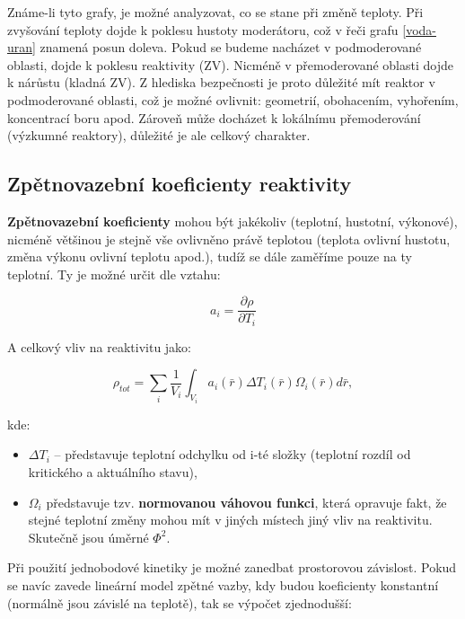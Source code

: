 Známe-li tyto grafy, je možné analyzovat, co se stane při změně teploty. Při zvyšování teploty dojde k poklesu hustoty moderátoru, což v řeči grafu \ref{voda-uran} znamená posun doleva. Pokud se budeme nacházet v podmoderované oblasti, dojde k poklesu reaktivity (ZV). Nicméně v přemoderované oblasti dojde k nárůstu (kladná ZV). Z hlediska bezpečnosti je proto důležité mít reaktor v podmoderované oblasti, což je možné ovlivnit: geometrií, obohacením, vyhořením, koncentrací boru apod. Zároveň může docházet k lokálnímu přemoderování (výzkumné reaktory), důležité je ale celkový charakter.

\subsection{Zpětnovazební koeficienty reaktivity}

\textbf{Zpětnovazební koeficienty} mohou být jakékoliv (teplotní, hustotní, výkonové), nicméně většinou je stejně vše ovlivněno právě teplotou (teplota ovlivní hustotu, změna výkonu ovlivní teplotu apod.), tudíž se dále zaměříme pouze na ty teplotní. Ty je možné určit dle vztahu:

\begin{equation}
  \boxed{
  a_i = \dfrac{\partial \rho}{\partial T_i}
  \label{zpetnovazebni_koeficient_definice}
  }
\end{equation}

A celkový vliv na reaktivitu jako:

\begin{equation}
  \boxed{
  \rho_{tot} = \sum_i \dfrac{1}{V_i} \int_{V_i} a_i(\bar{r}) \Delta T_i(\bar{r}) \Omega_i(\bar{r}) d\bar{r},
  \label{zpetnovazebni_koeficient_reaktivita}
  }
\end{equation}

kde:

\begin{itemize}
  \item $\Delta T_i$ -- představuje teplotní odchylku od i-té složky (teplotní rozdíl od kritického a aktuálního stavu),
  \item $\Omega_i$ představuje tzv. \textbf{normovanou váhovou funkci}, která opravuje fakt, že stejné teplotní změny mohou mít v jiných místech jiný vliv na reaktivitu. Skutečně jsou úměrné $\Phi^2$.
\end{itemize}

Při použití jednobodové kinetiky je možné zanedbat prostorovou závislost. Pokud se navíc zavede lineární model zpětné vazby, kdy budou koeficienty konstantní (normálně jsou závislé na teplotě), tak se výpočet zjednodušší:

